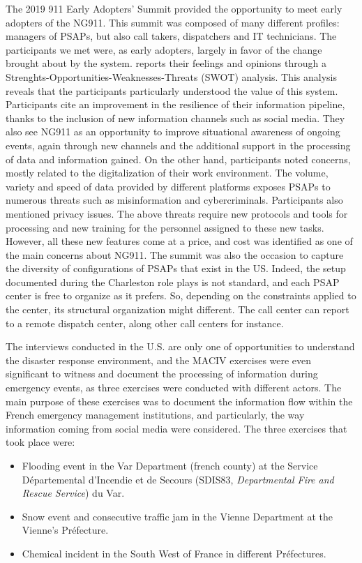 The 2019 911 Early Adopters’ Summit provided the opportunity to meet early adopters of the NG911.
This summit was composed of many different profiles: managers of PSAPs, but also call takers, dispatchers and IT technicians.
The participants we met were, as early adopters, largely in favor of the change brought about by the system.
\textcite{graceCommunicatingNextGeneration9112020} reports their feelings and opinions through a Strenghts-Opportunities-Weaknesses-Threats (SWOT) analysis.
This analysis reveals that the participants particularly understood the value of this system.
Participants cite an improvement in the resilience of their information pipeline, thanks to the inclusion of new information channels such as social media.
They also see NG911 as an opportunity to improve situational awareness of ongoing events, again through new channels and
the additional support in the processing of data and information gained.
On the other hand, participants noted concerns, mostly related to the digitalization of their work environment.
The volume, variety and speed of data provided by different platforms exposes PSAPs to numerous threats such as misinformation and cybercriminals.
Participants also mentioned privacy issues.
The above threats require new protocols and tools for processing and new training for the personnel assigned to these new tasks.
However, all these new features come at a price, and cost was identified as one of the main concerns about NG911.
The summit was also the occasion to capture the diversity of configurations of PSAPs that exist in the US.
Indeed, the setup documented during the Charleston role plays is not standard, and each PSAP center is free to organize as it prefers.
So, depending on the constraints applied to the center, its structural organization might different.
The call center can report to a remote dispatch center, along other call centers for instance.

The interviews conducted in the U.S. are only one of opportunities to understand the disaster response environment, and the MACIV exercises were even significant to witness and document the
processing of information during emergency events, as three exercises were conducted with different actors.
The main purpose of these exercises was to document the information flow within the French emergency management institutions, and particularly, the way information coming from social media were considered.
The three exercises that took place were:

\begin{itemize}
    \item Flooding event in the Var Department (french county) at the Service Départemental d’Incendie et de Secours (SDIS83, \textit{Departmental Fire and Rescue Service}) du Var.
    \item Snow event and consecutive traffic jam in the Vienne Department at the Vienne's Préfecture.
    \item Chemical incident in the South West of France in different Préfectures.
\end{itemize}

